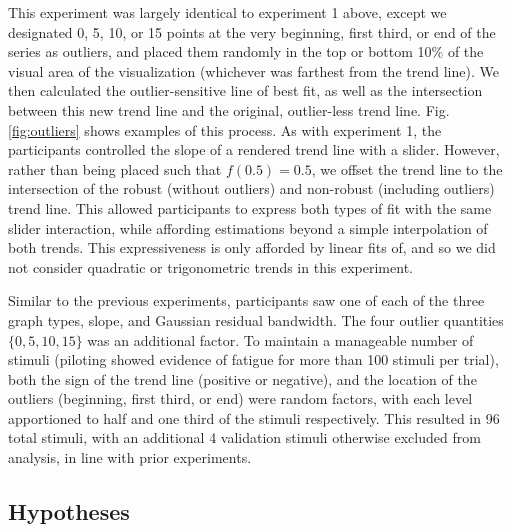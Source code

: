 \documentclass{sigchi}
\begin{document}
This experiment was largely identical to experiment 1 above, except we designated 0, 5, 10, or 15 points at the very beginning, first third, or end of the series as outliers, and placed them randomly in the top or bottom 10\% of the visual area of the visualization (whichever was farthest from the trend line). We then calculated the outlier-sensitive line of best fit, as well as the intersection between this new trend line and the original, outlier-less trend line. Fig. \ref{fig:outliers} shows examples of this process. As with experiment 1, the participants controlled the slope of a rendered trend line with a slider. However, rather than being placed such that $f(0.5)=0.5$, we offset the trend line to the intersection of the robust (without outliers) and non-robust (including outliers) trend line. This allowed participants to express both types of fit with the same slider interaction, while affording estimations beyond a simple interpolation of both trends. This expressiveness is only afforded by linear fits of, and so we did not consider quadratic or trigonometric trends in this experiment.

Similar to the previous experiments, participants saw one of each of the three graph types, slope, and Gaussian residual bandwidth. The four outlier quantities $\{0,5,10,15\}$ was an additional factor. To maintain a manageable number of stimuli (piloting showed evidence of fatigue for more than 100 stimuli per trial), both the sign of the trend line (positive or negative), and the location of the outliers (beginning, first third, or end) were random factors, with each level apportioned to half and one third of the stimuli respectively. This resulted in 96 total stimuli, with an additional 4 validation stimuli otherwise excluded from analysis, in line with prior experiments.

\subsection{Hypotheses}
\end{document}
